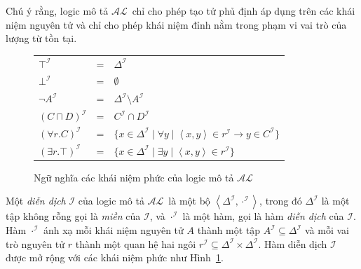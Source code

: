 \documentclass[12pt,a4paper]{report}
\newcommand{\mand}{\sqcap}
\newcommand{\V}{\forall}
\newcommand{\E}{\exists}
\newcommand{\AL}{$\mathcal{AL}$}
\newcommand{\mI}{\mathcal{I}}
\def\tuple#1{\left\langle#1\right\rangle}
\begin{document}
Chú ý rằng, logic mô tả \AL\ chỉ cho phép tạo tử phủ định áp dụng trên các khái niệm nguyên tử và chỉ cho phép khái niệm đỉnh nằm trong phạm vi vai trò của lượng từ tồn tại.

\begin{figure}[h]
  \begin{center}
    \begin{tabular}{|l c l|}
      \hline
      $\top^\mI$ &\!\!\!\!=\!\!\!\!& $\Delta^\mI$\\
      $\bot^\mI$ &\!\!\!\!=\!\!\!\!& $\emptyset$\\
      $\neg A^\mI$ &\!\!\!\!=\!\!\!\!& $\Delta^\mI \setminus A^\mI$\\
      $(C \mand D)^\mI$ &\!\!\!\!=\!\!\!\!& $C^\mI \cap D^\mI$\\
      $(\V r.C)^\mI$ &\!\!\!\!=\!\!\!\!& $\{x \in \Delta^\mI \mid \V y \mid \tuple{x, y} \in r^\mI \rightarrow y \in C^\mI\}$\\
      $(\E r.\top)^\mI$ &\!\!\!\!=\!\!\!\!& $\{x \in \Delta^\mI \mid \E y \mid \tuple{x, y} \in r^\mI\}$\\
    
    \hline
    \end{tabular}
    \caption{Ngữ nghĩa các khái niệm phức của logic mô tả \AL}\label{fig:SemanticAL}
  \end{center}
\end{figure}

Một \textit{diễn dịch} $\mI$ của logic mô tả \AL\ là một bộ $\tuple{\Delta^\mI, \cdot^\mI}$, trong đó $\Delta^\mI$ là một tập không rỗng gọi là \textit{miền} của $\mI$, và $\cdot^\mI$ là một hàm, gọi là hàm \textit{diễn dịch} của $\mI$. Hàm $\cdot^\mI$ ánh xạ mỗi khái niệm nguyên tử $A$ thành một tập $A^\mI \subseteq \Delta^\mI$ và mỗi vai trò nguyên tử $r$ thành một quan hệ hai ngôi $r^\mI \subseteq \Delta^\mI \times \Delta^\mI$.  Hàm diễn dịch $\mI$ được mở rộng với các khái niệm phức như Hình~\ref{fig:SemanticAL}.
\end{document}
